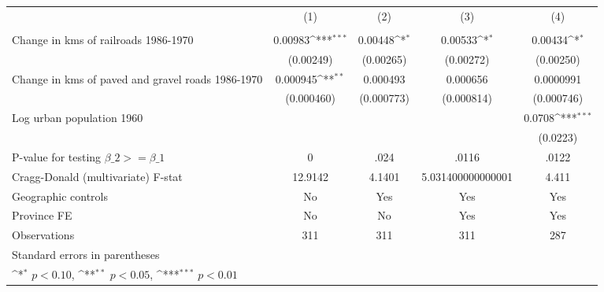 {
\def\sym#1{\ifmmode^{#1}\else\(^{#1}\)\fi}
\begin{tabular}{l*{4}{c}}
\hline\hline
                &\multicolumn{1}{c}{(1)}&\multicolumn{1}{c}{(2)}&\multicolumn{1}{c}{(3)}&\multicolumn{1}{c}{(4)}\\
                &\multicolumn{1}{c}{}&\multicolumn{1}{c}{}&\multicolumn{1}{c}{}&\multicolumn{1}{c}{}\\
\hline
Change in kms of railroads 1986-1970&  0.00983\sym{***}&  0.00448\sym{*}  &  0.00533\sym{*}  &  0.00434\sym{*}  \\
                &(0.00249)         &(0.00265)         &(0.00272)         &(0.00250)         \\
[1em]
Change in kms of paved and gravel roads 1986-1970& 0.000945\sym{**} & 0.000493         & 0.000656         &0.0000991         \\
                &(0.000460)         &(0.000773)         &(0.000814)         &(0.000746)         \\
[1em]
Log urban population 1960&                  &                  &                  &   0.0708\sym{***}\\
                &                  &                  &                  & (0.0223)         \\
\hline
P-value for testing $\beta\_{2} >= \beta\_{1}$&        0         &     .024         &    .0116         &    .0122         \\
Cragg-Donald (multivariate) F-stat&  12.9142         &   4.1401         &5.031400000000001         &    4.411         \\
Geographic controls&       No         &      Yes         &      Yes         &      Yes         \\
Province FE     &       No         &       No         &      Yes         &      Yes         \\
Observations    &      311         &      311         &      311         &      287         \\
\hline\hline
\multicolumn{5}{l}{\footnotesize Standard errors in parentheses}\\
\multicolumn{5}{l}{\footnotesize \sym{*} \(p<0.10\), \sym{**} \(p<0.05\), \sym{***} \(p<0.01\)}\\
\end{tabular}
}
